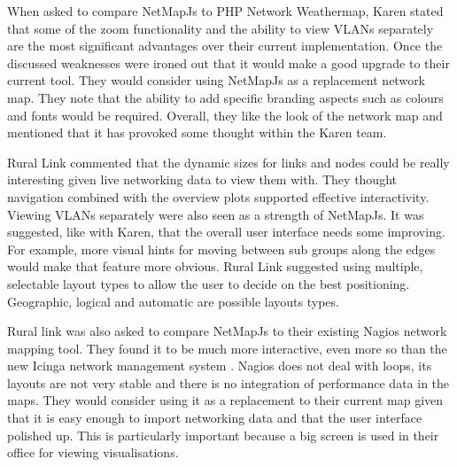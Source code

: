 \documentclass[11pt, a4paper]{article}
\begin{document}
When asked to compare NetMapJs to PHP Network Weathermap, Karen stated that some
of the zoom functionality and the ability to view VLANs separately are the most
significant advantages over their current implementation. Once the discussed
weaknesses were ironed out that it would make a good upgrade to their current
tool. They would consider using NetMapJs as a replacement network map. They note
that the ability to add specific branding aspects such as colours and fonts
would be required. Overall, they like the look of the network map and mentioned
that it has provoked some thought within the Karen team.


Rural Link commented that the dynamic sizes for links and nodes could be really
interesting given live networking data to view them with. They thought
navigation combined with the overview plots supported effective interactivity.
Viewing VLANs separately were also seen as a strength of NetMapJs. It was
suggested, like with Karen, that the overall user interface needs some
improving. For example, more visual hints for moving between sub groups along
the edges would make that feature more obvious. Rural Link suggested using
multiple, selectable layout types to allow the user to decide on the best
positioning. Geographic, logical and automatic are possible layouts types. 

Rural link was also asked to compare NetMapJs to their existing Nagios network
mapping tool. They found it to be much more interactive, even more so than the
new Icinga network management system \cite{Icinga_website}. Nagios does not deal
with loops, its layouts are not very stable and there is no integration of
performance data in the maps. They would consider using it as a replacement to
their current map given that it is easy enough to import networking data and
that the user interface polished up. This is particularly important because a
big screen is used in their office for viewing visualisations. 
\end{document}
